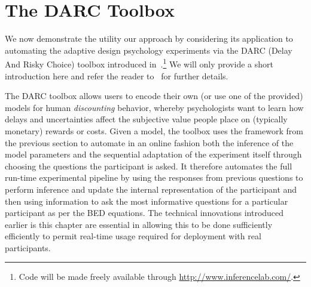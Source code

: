 
\section{The DARC Toolbox}
\label{sec:design:darc}

We now demonstrate the utility our approach by considering its application 
to automating the adaptive design psychology experiments via the DARC (Delay
And Risky Choice) toolbox introduced in~\cite{vincent2017darc}.\footnote{Code will be made freely
	available through \url{http://www.inferencelab.com/}.}  We will only provide
a short introduction here and refer the reader to~\cite{vincent2017darc} for further details.

The DARC toolbox allows users 
to encode their own (or use one of the provided) models for human \emph{discounting} behavior,
whereby psychologists want to learn how delays and uncertainties affect the subjective value people place
on (typically monetary) rewards or costs. Given a model, the toolbox uses the framework from the
previous section to automate in an online fashion 
both the inference of the model parameters and the sequential adaptation of the experiment itself through
choosing the questions the participant is asked.  It therefore automates the full run-time experimental 
pipeline  by using the responses from previous questions to perform inference 
and update the internal representation
of the participant and then using information to ask the most informative questions for a particular
participant as per the BED equations.  The technical innovations introduced earlier is this chapter
are essential in allowing this to be done sufficiently efficiently to permit
real-time usage required for deployment with real participants.

